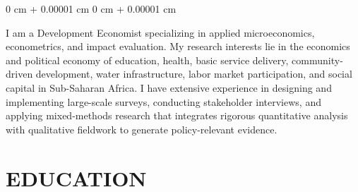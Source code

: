 \documentclass[10 pt, letterpaper]{article}
\newenvironment{onecolentry}{
    \begin{adjustwidth}{
        0 cm + 0.00001 cm
    }{
        0 cm + 0.00001 cm
    }
}{
    \end{adjustwidth}
} %
\begin{document}
    \begin{onecolentry}



        I am a Development Economist specializing in applied microeconomics, econometrics, and impact evaluation. My research interests lie in the economics and political economy of education, health, basic service delivery, community-driven development, water infrastructure, labor market participation, and social capital in Sub-Saharan Africa. I have extensive experience in designing and implementing large-scale surveys, conducting stakeholder interviews, and applying mixed-methods research that integrates rigorous quantitative analysis with qualitative fieldwork to generate policy-relevant evidence.
        

    \end{onecolentry}
        \vspace{0.15 cm}
    
    \section{EDUCATION}
        
\end{document}
